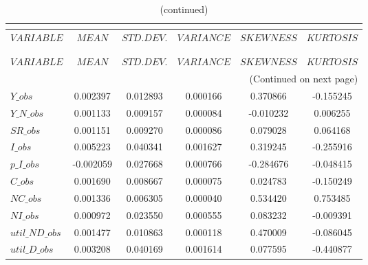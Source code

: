  
\begin{center}
\begin{longtable}{lccccc} 
\caption{MOMENTS OF SIMULATED VARIABLES}\\
 \label{Table:sim_moments}\\
\toprule 
$VARIABLE       $	 & 	 $            MEAN$	 & 	 $       STD. DEV.$	 & 	 $        VARIANCE$	 & 	 $        SKEWNESS$	 & 	 $        KURTOSIS$\\
\midrule \endfirsthead 
\caption{(continued)}\\
 \toprule \\ 
$VARIABLE       $	 & 	 $            MEAN$	 & 	 $       STD. DEV.$	 & 	 $        VARIANCE$	 & 	 $        SKEWNESS$	 & 	 $        KURTOSIS$\\
\midrule \endhead 
\midrule \multicolumn{6}{r}{(Continued on next page)} \\ \bottomrule \endfoot 
\bottomrule \endlastfoot 
$Y\_obs         $	 & 	        0.002397	 & 	        0.012893	 & 	        0.000166	 & 	        0.370866	 & 	       -0.155245 \\ 
$Y\_N\_obs      $	 & 	        0.001133	 & 	        0.009157	 & 	        0.000084	 & 	       -0.010232	 & 	        0.006255 \\ 
$SR\_obs        $	 & 	        0.001151	 & 	        0.009270	 & 	        0.000086	 & 	        0.079028	 & 	        0.064168 \\ 
$I\_obs         $	 & 	        0.005223	 & 	        0.040341	 & 	        0.001627	 & 	        0.319245	 & 	       -0.255916 \\ 
$p\_I\_obs      $	 & 	       -0.002059	 & 	        0.027668	 & 	        0.000766	 & 	       -0.284676	 & 	       -0.048415 \\ 
$C\_obs         $	 & 	        0.001690	 & 	        0.008667	 & 	        0.000075	 & 	        0.024783	 & 	       -0.150249 \\ 
$NC\_obs        $	 & 	        0.001336	 & 	        0.006305	 & 	        0.000040	 & 	        0.534420	 & 	        0.753485 \\ 
$NI\_obs        $	 & 	        0.000972	 & 	        0.023550	 & 	        0.000555	 & 	        0.083232	 & 	       -0.009391 \\ 
$util\_ND\_obs  $	 & 	        0.001477	 & 	        0.010863	 & 	        0.000118	 & 	        0.470009	 & 	       -0.086045 \\ 
$util\_D\_obs   $	 & 	        0.003208	 & 	        0.040169	 & 	        0.001614	 & 	        0.077595	 & 	       -0.440877 \\ 

\end{longtable}
\end{center}

